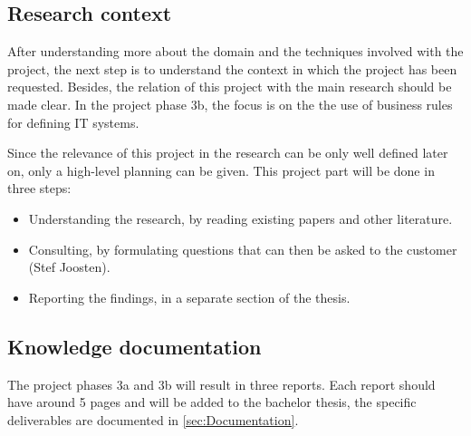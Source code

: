 \subsection{Research context}
%
After understanding more about the domain and the techniques involved with the project, the next step is to understand the context in which the project has been requested.
Besides, the relation of this project with the main research should be made clear.
In the project phase 3b, the focus is on the the use of business rules for defining IT systems.

Since the relevance of this project in the research can be only well defined later on, only a high-level planning can be given.
This project part will be done in three steps:
\begin{itemize}
	\item Understanding the research, by reading existing papers and other literature.
	\item Consulting, by formulating questions that can then be asked to the customer (Stef Joosten).
	\item Reporting the findings, in a separate section of the thesis.
\end{itemize}

\subsection{Knowledge documentation}
The project phases 3a and 3b will result in three reports.
Each report should have around 5 pages and will be added to the bachelor thesis, the specific deliverables are documented in \autoref{sec:Documentation}.

